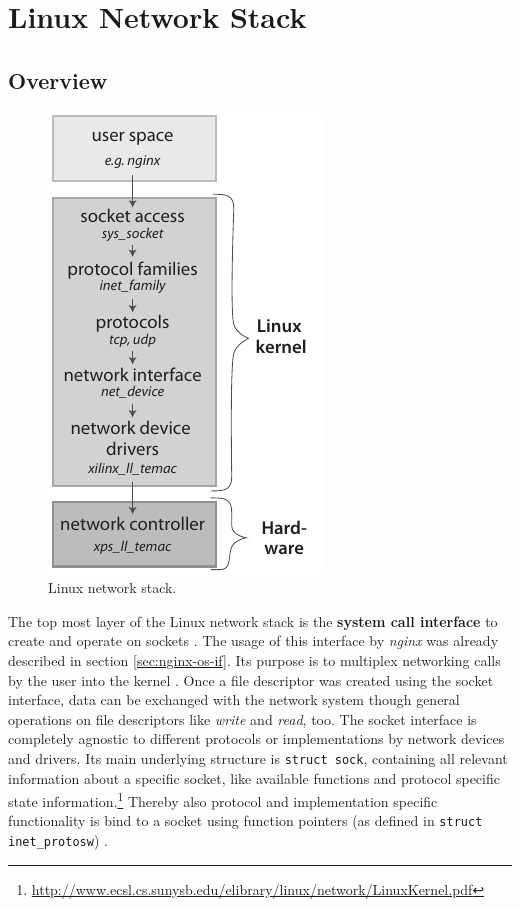\chapter{Linux Network Stack}

\section{Overview}

\begin{figure}
	\centering
	\includegraphics[scale=1]{images/net-stack.pdf}
	\caption{Linux network stack.}
	\label{fig:net-stack}
\end{figure}
The top most layer of the Linux network stack is the \textbf{system call interface} to create and operate on sockets \cite{netstackana}. The usage of this interface by \textit{nginx} was already described in section \ref{sec:nginx-os-if}. Its purpose is to multiplex networking calls by the user into the kernel \cite{netstackana}. Once a file descriptor was created using the socket interface, data can be exchanged with the network system though general operations on file descriptors like \textit{write} and \textit{read}, too. The socket interface is completely agnostic to different protocols or implementations by network devices and drivers. Its main underlying structure is \texttt{struct sock}, containing all relevant information about a specific socket, like available functions and protocol specific state information.\footnote{\url{http://www.ecsl.cs.sunysb.edu/elibrary/linux/network/LinuxKernel.pdf}} Thereby also protocol and implementation specific functionality is bind to a socket using function pointers (as defined in \texttt{struct inet\_protosw}) \cite{netstackana}.

